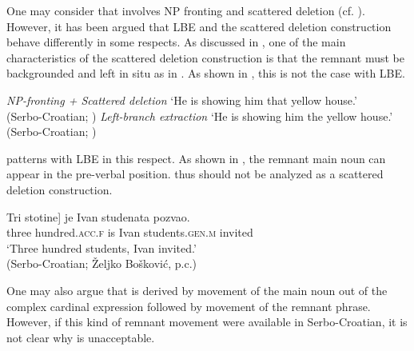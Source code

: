 \documentclass[output=paper]{langscibook}
\begin{document}
One may consider that  involves NP fronting and scattered deletion (cf. \citealt{FanselowCavar2002}). However, it has been argued that LBE and the scattered deletion construction behave differently in some respects. As discussed in \citet{Boskovic2014}, one of the main characteristics of the scattered deletion construction is that the remnant must be backgrounded and left in situ as in . As shown in , this is not the case with LBE.

\ea\label{tat:ex:bos2}{\textit{NP-fronting + Scattered deletion}}
\z
\glt `He is showing him that yellow house.'\\
\hfill (Serbo-Croatian; \citealt[421]{Boskovic2014})
\ex\label{tat:ex:bos3}{\textit{Left-branch extraction}}
\z
\glt `He is showing him the yellow house.'\\
\hfill (Serbo-Croatian; \citealt[421]{Boskovic2014})
\z

\noindent {} patterns with LBE in this respect. As shown in , the remnant main noun can appear in the pre-verbal position.  thus should not be analyzed as a scattered deletion construction.

\ea\label{tat:bos4}
\gll \minsp{[} Tri stotine] je Ivan studenata pozvao.\\  
     {} three hundred.\textsc{acc.f} is Ivan students.\textsc{gen.m} invited\\ 
\glt `Three hundred students, Ivan invited.'\\
\hfill(Serbo-Croatian; \v{Z}eljko Bo\v{s}kovi\'c, p.c.)
\z

\noindent One may also argue that  is derived by movement of the main noun out of the complex cardinal expression followed by movement of the remnant phrase. However, if this kind of remnant movement were available in Serbo-Croatian, it is not clear why  is unacceptable. 
\end{document}
